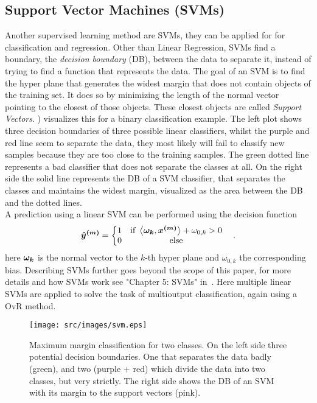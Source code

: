 \subsection{Support Vector Machines (SVMs)}\label{subsec:support-vector-machines}
Another supervised learning method are SVMs, they can be applied for for classification and regression.
Other than Linear Regression, SVMs find a boundary, the \textit{decision boundary} (DB), between the data to separate it, instead of trying to find a function that represents the data.
The goal of an SVM is to find the hyper plane that generates the widest margin that does not contain objects of the training set.
It does so by minimizing the length of the normal vector pointing to the closest of those objects.
These closest objects are called \textit{Support Vectors}.
) visualizes this for a binary classification example.
The left plot shows three decision boundaries of three possible linear classifiers, whilst the purple and red line seem to separate the data, they most likely will fail to classify new samples because they are too close to the training samples.
The green dotted line represents a bad classifier that does not separate the classes at all.
On the right side the solid line represents the DB of a SVM classifier, that separates the classes and maintains the widest margin, visualized as the area between the DB and the dotted lines.\\
A prediction using a linear SVM can be performed using the decision function
\begin{align}
    \bm{\hat{y}^{(m)}} = \left\{
    \begin{matrix}
        1 & \text{if } \left\langle\bm{\omega_k},\bm{x^{(m)}}\right\rangle+\omega_{0,k} > 0\\
        0 & \text{else}
    \end{matrix}\right. \quad .
\end{align}
here $\bm{\omega_k}$ is the normal vector to the $k$-th hyper plane and $\omega_{0,k}$ the corresponding bias.
Describing SVMs further goes beyond the scope of this paper, for more details and how SVMs work see "Chapter 5: SVMs" in~\cite{handsOn}.
Here multiple linear SVMs are applied to solve the task of multioutput classification, again using a OvR method.
\begin{figure}
    \centering
    \texttt{[image: src/images/svm.eps]}
    \caption{
    \footnotemark
        Maximum margin classification for two classes.
        On the left side three potential decision boundaries.
        One that separates the data badly (green), and two (purple + red) which divide the data into two classes, but very strictly. The right side shows the DB of an SVM with its margin to the support vectors (pink).
    }
    \label{fig:svm}
\end{figure}
